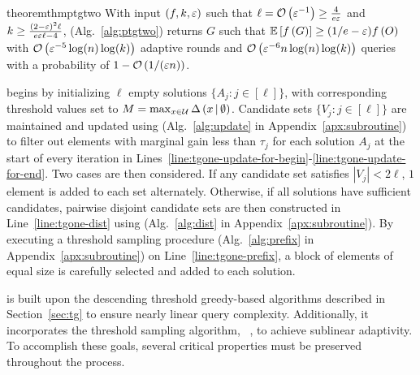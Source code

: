 \begin{restatable}{theorem}{thmptgtwo}\label{thm:ptgtwo}
With input $(f, k, \varepsilon)$ such that
$\ell = \mathcal O \left( \varepsilon^{-1} \right)\ge \frac{4}{e\varepsilon}$
and $k \ge \frac{(2-\varepsilon)^2\ell}{e\varepsilon\ell-4}$,
\ptgtwoshort (Alg.~\ref{alg:ptgtwo}) returns $G$
such that $\mathbb{E}\left[ f \left( G \right) \right] \ge (1/e-\varepsilon)f \left( O \right)$
with $\mathcal O \left( \varepsilon^{-5}\log(n)\log(k) \right)$ adaptive rounds and $\mathcal O \left( \varepsilon^{-6}n\log(n)\log(k) \right)$ queries with a probability of $1-\mathcal O \left( 1/(\varepsilon n) \right)$.
\end{restatable}
\ptgoneshort begins by initializing $\ell$ empty solutions $\{A_j: j\in [\ell]\}$,
with corresponding threshold values set to 
$M = \max_{x\in \mathcal U}\Delta \left( x \, \middle| \, \emptyset \right)$. 
Candidate sets $\{V_j: j\in [\ell]\}$ are maintained
and updated using \update
(Alg.~\ref{alg:update} in Appendix~\ref{apx:subroutine})
to filter out elements with marginal gain
less than $\tau_j$ for each solution $A_j$ 
at the start of every iteration 
in Lines~\ref{line:tgone-update-for-begin}-\ref{line:tgone-update-for-end}.
Two cases are then considered.
If any candidate set satisfies $|V_j| < 2\ell$,
$1$ element is added to each set alternately.
Otherwise, if all solutions have sufficient candidates,
pairwise disjoint candidate sets are then constructed in Line~\ref{line:tgone-dist} using \dist (Alg.~\ref{alg:dist} in Appendix~\ref{apx:subroutine}).
By executing a threshold sampling procedure \prefix (Alg.~\ref{alg:prefix} in Appendix~\ref{apx:subroutine}) on Line~\ref{line:tgone-prefix},
a block of elements of equal size is carefully selected and added to each solution.


\ptgoneshort is built upon the descending threshold greedy-based algorithms described in Section~\ref{sec:tg} to ensure nearly linear query complexity.
Additionally, it incorporates the threshold sampling algorithm, \ts~\citep{Chen2024},
to achieve sublinear adaptivity.
%
To accomplish these goals,
several critical properties must be preserved throughout the process.

